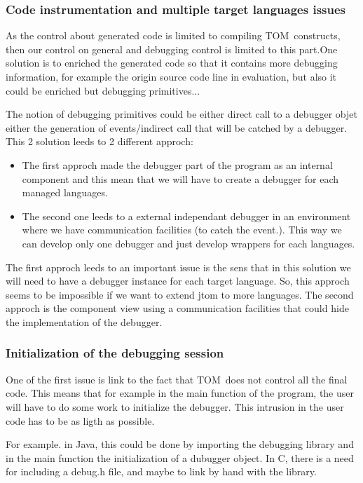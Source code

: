 \documentclass[a4paper]{article}
\newcommand{\TOM}{\textsf{TOM}}
\newcommand{\C}{\textsf{C}}
\newcommand{\Java}{\textsf{Java}}
\begin{document}
\subsubsection{Code instrumentation and multiple
  target languages issues}

As the control about generated code is limited to compiling \TOM\
constructs, then our control on general and debugging control is
limited to this part.One solution is to enriched the generated code so
that it contains more debugging information, for example the origin
source code line in evaluation, but also it could be enriched but debugging
primitives... 

The notion of debugging primitives could be either direct call to a
debugger objet either the generation of events/indirect call that will
be catched by a debugger. This 2 solution leeds to 2 different approch:
\begin{itemize}
\item The first approch made the debugger part of the program as an
  internal component and this mean that we will have to create a
  debugger for each managed languages.
\item The second one leeds to a external independant debugger
  in an environment where we have communication facilities (to catch
  the event.). This way we can develop only one debugger and just
  develop wrappers for each languages. 
\end{itemize}
The first approch leeds to an important issue is the sens that in this
solution we will need to have a debugger instance for each target
language. So, this approch seems to be impossible if we want to extend
jtom to more languages. The second approch is the component view using
a communication facilities that could hide the implementation of the debugger.

\subsubsection{Initialization of the debugging session}

One of the first issue is link to the fact that \TOM\ does not control
all the final code. This means that for example in the main function
of the program, the user will have to do some work to initialize the
debugger. This intrusion in the user code has to be as ligth as possible.

For example. in \Java, this could be done by importing the debugging
library and in the main function the initialization of a dubugger
object.
In \C, there is a need for including a debug.h file, and maybe to link
by hand with the library.
 
\end{document}

